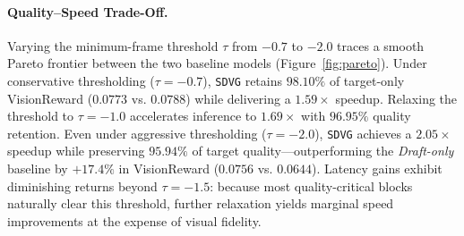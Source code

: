 \documentclass{article} %
\newcommand{\threshold}{\tau}
\begin{document}


\paragraph{Quality--Speed Trade-Off.}
Varying the minimum-frame threshold $\threshold$ from $-0.7$ to $-2.0$ traces a smooth Pareto frontier between the two baseline models (Figure~\ref{fig:pareto}). Under conservative thresholding ($\threshold = -0.7$), \texttt{SDVG} retains $98.10\%$ of target-only VisionReward ($0.0773$ vs. $0.0788$) while delivering a $\mathbf{1.59\times}$ speedup. Relaxing the threshold to $\threshold = -1.0$ accelerates inference to $\mathbf{1.69\times}$ with $96.95\%$ quality retention. Even under aggressive thresholding ($\threshold = -2.0$), \texttt{SDVG} achieves a $\mathbf{2.05\times}$ speedup while preserving $95.94\%$ of target quality—outperforming the \emph{Draft-only} baseline by $+17.4\%$ in VisionReward ($0.0756$ vs. $0.0644$). Latency gains exhibit diminishing returns beyond $\threshold = -1.5$: because most quality-critical blocks naturally clear this threshold, further relaxation yields marginal speed improvements at the expense of visual fidelity.
\end{document}
